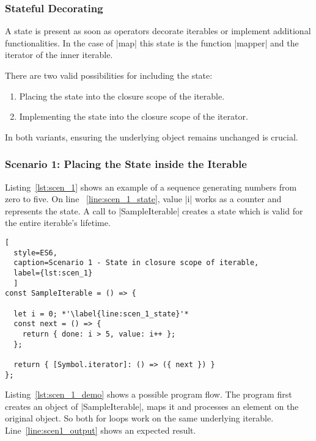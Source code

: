 \subsubsection{Stateful Decorating}
\label{subsub:Stateful Decorating}
A state is present as soon as operators decorate iterables or implement 
additional functionalities. In the case of |map| this state is the function
|mapper| and the iterator of the inner iterable.

There are two valid possibilities for including the state:
\begin{enumerate}
  \item Placing the state into the closure scope of the iterable.
  \item Implementing the state into the closure scope of the iterator.
\end{enumerate}
In both variants, ensuring the underlying object remains unchanged is crucial.

\subsubsection{Scenario 1: Placing the State inside the Iterable}
\label{subsub:Scenario 1}
Listing~\ref{lst:scen_1} shows an example of a sequence generating numbers from
zero to five. On line ~\ref{line:scen_1_state}, value |i| works as a counter 
and represents the state. 
A call to |SampleIterable| creates a state which is valid for the entire
iterable's lifetime.

\begin{lstlisting}[
  style=ES6, 
  caption=Scenario 1 - State in closure scope of iterable,
  label={lst:scen_1}
  ]
const SampleIterable = () => {

  let i = 0; *'\label{line:scen_1_state}'*
  const next = () => {
    return { done: i > 5, value: i++ };
  };

  return { [Symbol.iterator]: () => ({ next }) }
};
\end{lstlisting}

Listing~\ref{lst:scen_1_demo} shows a possible program flow. The program first
creates an object of |SampleIterable|, maps it and processes an element on the
original object. So both for loops work on the same underlying iterable.
Line~\ref{line:scen1_output} shows an expected result.

